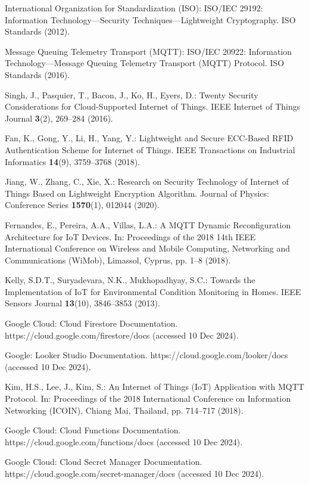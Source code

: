 \documentclass[runningheads]{llncs}
\begin{document}
\begin{thebibliography}{23}
 International Organization for Standardization (ISO): ISO/IEC 29192: Information Technology—Security Techniques—Lightweight Cryptography. ISO Standards (2012).

 Message Queuing Telemetry Transport (MQTT): ISO/IEC 20922: Information Technology—Message Queuing Telemetry Transport (MQTT) Protocol. ISO Standards (2016).

 Singh, J., Pasquier, T., Bacon, J., Ko, H., Eyers, D.: Twenty Security Considerations for Cloud-Supported Internet of Things. IEEE Internet of Things Journal \textbf{3}(2), 269–284 (2016).

 Fan, K., Gong, Y., Li, H., Yang, Y.: Lightweight and Secure ECC-Based RFID Authentication Scheme for Internet of Things. IEEE Transactions on Industrial Informatics \textbf{14}(9), 3759–3768 (2018). 

 Jiang, W., Zhang, C., Xie, X.: Research on Security Technology of Internet of Things Based on Lightweight Encryption Algorithm. Journal of Physics: Conference Series \textbf{1570}(1), 012044 (2020). 

 Fernandes, E., Pereira, A.A., Villas, L.A.: A MQTT Dynamic Reconfiguration Architecture for IoT Devices. In: Proceedings of the 2018 14th IEEE International Conference on Wireless and Mobile Computing, Networking and Communications (WiMob), Limassol, Cyprus, pp. 1–8 (2018). 

 Kelly, S.D.T., Suryadevara, N.K., Mukhopadhyay, S.C.: Towards the Implementation of IoT for Environmental Condition Monitoring in Homes. IEEE Sensors Journal \textbf{13}(10), 3846–3853 (2013). 

 Google Cloud: Cloud Firestore Documentation. https://cloud.google.com/firestore/docs (accessed 10 Dec 2024).

 Google: Looker Studio Documentation. https://cloud.google.com/looker/docs (accessed 10 Dec 2024).

 Kim, H.S., Lee, J., Kim, S.: An Internet of Things (IoT) Application with MQTT Protocol. In: Proceedings of the 2018 International Conference on Information Networking (ICOIN), Chiang Mai, Thailand, pp. 714–717 (2018). 

 Google Cloud: Cloud Functions Documentation. https://cloud.google.com/functions/docs (accessed 10 Dec 2024).

 Google Cloud: Cloud Secret Manager Documentation. https://cloud.google.com/secret-manager/docs (accessed 10 Dec 2024).
\end{thebibliography}
\end{document}
